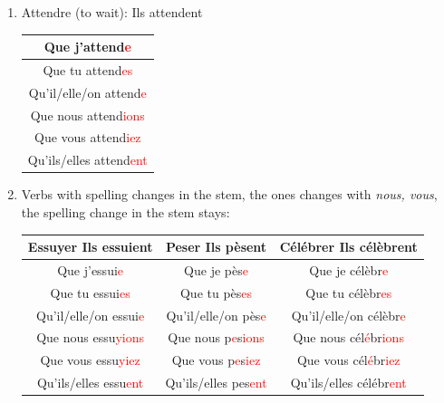 \documentclass{book}
\begin{document}
\begin{enumerate}
            \item Attendre (to wait): Ils attendent
                \begin{center}
                    \begin{tabular}{|c|}
                        \hline
                        Que j'attend\textcolor{red}{e} \\
                        \hline
                        Que tu attend\textcolor{red}{es} \\
                        \hline
                        Qu'il/elle/on attend\textcolor{red}{e} \\
                        \hline
                        Que nous attend\textcolor{red}{ions} \\
                        \hline
                        Que vous attend\textcolor{red}{iez} \\
                        \hline
                        Qu'ils/elles attend\textcolor{red}{ent} \\
                        \hline                
                    \end{tabular}
                \end{center}

            \item Verbs with spelling changes in the stem, the ones changes with \textit{nous, vous}, the spelling change in the stem stays:
                \begin{center}
                    \begin{tabular}{|c|c|c|}
                        \hline
                        \textbf{Essuyer} Ils essuient & \textbf{Peser} Ils pèsent & \textbf{Célébrer} Ils célèbrent \\
                        \hline
                        Que j'essui\textcolor{red}{e} & Que je pès\textcolor{red}{e} & Que je célèbr\textcolor{red}{e} \\
                        \hline
                        Que tu essui\textcolor{red}{es} & Que tu pès\textcolor{red}{es} & Que tu célèbr\textcolor{red}{es} \\
                        \hline
                        Qu'il/elle/on essui\textcolor{red}{e} & Qu'il/elle/on pès\textcolor{red}{e} & Qu'il/elle/on célèbr\textcolor{red}{e} \\
                        \hline
                        Que nous essu\textcolor{red}{yions} & Que nous p\textcolor{red}{e}s\textcolor{red}{ions} & Que nous cél\textcolor{red}{é}br\textcolor{red}{ions} \\
                        \hline
                        Que vous essu\textcolor{red}{yiez} & Que vous p\textcolor{red}{e}s\textcolor{red}{iez} & Que vous cél\textcolor{red}{é}br\textcolor{red}{iez} \\
                        \hline
                        Qu'ils/elles essu\textcolor{red}{ent} & Qu'ils/elles pes\textcolor{red}{ent} & Qu'ils/elles célébr\textcolor{red}{ent} \\
                        \hline
                    \end{tabular} 
                \end{center}


\end{enumerate}
\end{document}
